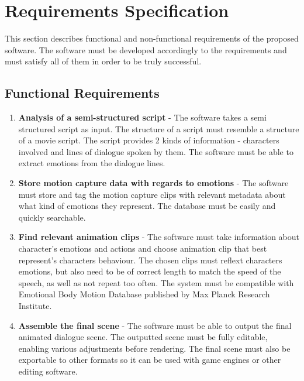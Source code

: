 \chapter{Requirements Specification\label{chap:requirements}}

\noindent This section describes functional and non-functional requirements of the proposed software. The software must be developed accordingly to the requirements  and must satisfy all of them in order to be truly successful.


\section{Functional Requirements}

\begin{enumerate}

\item {\bf Analysis of a semi-structured script} - The software takes a semi structured script as input. The structure of a script must resemble a structure of a movie script. The script provides 2 kinds of information - characters involved and lines of dialogue spoken by them. The software must be able to extract emotions from the dialogue lines.

\item {\bf Store motion capture data with regards to emotions} - The software must store and tag the motion capture clips with relevant metadata about what kind of emotions they represent. The database must be easily and quickly searchable.

\item {\bf Find relevant animation clips} - The software must take information about character's emotions and actions and choose animation clip that best represent's characters behaviour. The chosen clips must reflext characters emotions, but also need to be of correct length to match the speed of the speech, as well as not repeat too often. The system must be compatible with Emotional Body Motion Database published by Max Planck Research Institute.

\item {\bf Assemble the final scene} -  The software must be able to output the final animated dialogue scene. The outputted scene must be fully editable, enabling various adjustments before rendering. The final scene must also be exportable to other formats so it can be used with game engines or other editing software.

\end{enumerate}


